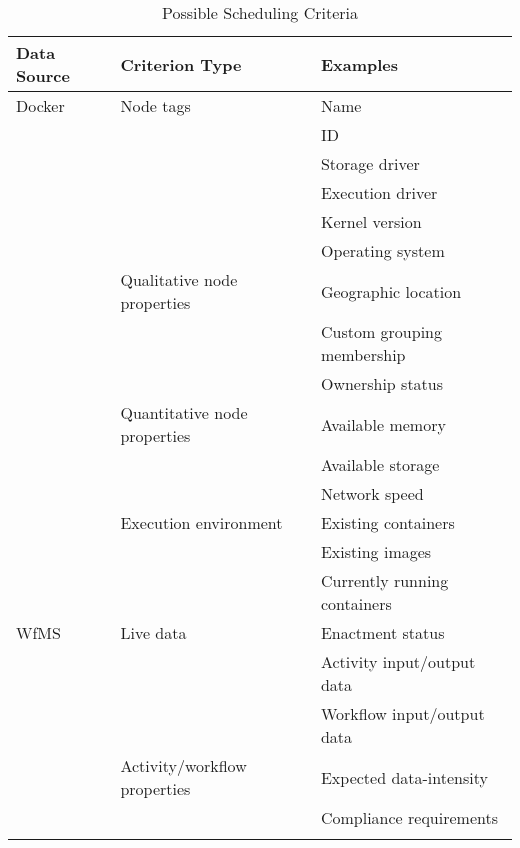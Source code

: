     \begin{table}[!tbp]
      \centering
      \begin{tabular}{l l l}
        \toprule
        Data Source & Criterion Type & Examples \\
        \midrule
        Docker
          & Node tags
            & Name \\
            && \ac{ID} \\
            && Storage driver \\
            && Execution driver \\
            && Kernel version  \\
            && Operating system \\ [1.2ex]
          & Qualitative node properties
            & Geographic location\\
            && Custom grouping membership\\
            && Ownership status\\ [1.2ex]
          & Quantitative node properties
            & Available memory \\
            && Available storage \\
            && Network speed \\ [1.2ex]
          & Execution environment
            & Existing containers \\
            && Existing images \\
            && Currently running containers \\ [1.4ex]
        WfMS
          & Live data
            & Enactment status \\
            && Activity input/output data \\
            && Workflow input/output data \\ [1.2ex]
          & Activity/workflow properties
            & Expected data-intensity \\
            && Compliance requirements\\
            &&\\ [1.2ex]
        \bottomrule
      \end{tabular}
      \caption{Possible Scheduling Criteria}
      \label{tab:scheduling_criteria}
    \end{table}

